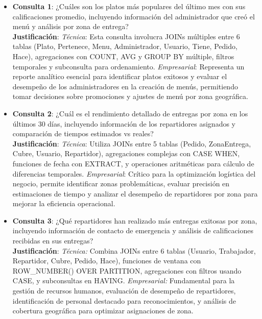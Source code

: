 \documentclass[12pt,a4paper]{article}
\begin{document}
\begin{itemize}
    \item \textbf{Consulta 1}: ¿Cuáles son los platos más populares del último mes con sus calificaciones promedio, incluyendo información del administrador que creó el menú y análisis por zona de entrega?\\
    \textbf{Justificación}: \textit{Técnica}: Esta consulta involucra JOINs múltiples entre 6 tablas (Plato, Pertenece, Menu, Administrador, Usuario, Tiene, Pedido, Hace), agregaciones con COUNT, AVG y GROUP BY múltiple, filtros temporales y subconsulta para ordenamiento. \textit{Empresarial}: Representa un reporte analítico esencial para identificar platos exitosos y evaluar el desempeño de los administradores en la creación de menús, permitiendo tomar decisiones sobre promociones y ajustes de menú por zona geográfica.

    \item \textbf{Consulta 2}: ¿Cuál es el rendimiento detallado de entregas por zona en los últimos 30 días, incluyendo información de los repartidores asignados y comparación de tiempos estimados vs reales?\\
    \textbf{Justificación}: \textit{Técnica}: Utiliza JOINs entre 5 tablas (Pedido, ZonaEntrega, Cubre, Usuario, Repartidor), agregaciones complejas con CASE WHEN, funciones de fecha con EXTRACT, y operaciones aritméticas para cálculo de diferencias temporales. \textit{Empresarial}: Crítico para la optimización logística del negocio, permite identificar zonas problemáticas, evaluar precisión en estimaciones de tiempo y analizar el desempeño de repartidores por zona para mejorar la eficiencia operacional.

    \item \textbf{Consulta 3}: ¿Qué repartidores han realizado más entregas exitosas por zona, incluyendo información de contacto de emergencia y análisis de calificaciones recibidas en sus entregas?\\
    \textbf{Justificación}: \textit{Técnica:} Combina JOINs entre 6 tablas (Usuario, Trabajador, Repartidor, Cubre, Pedido, Hace), funciones de ventana con ROW\_NUMBER() OVER PARTITION, agregaciones con filtros usando CASE, y subconsultas en HAVING. \textit{Empresarial:} Fundamental para la gestión de recursos humanos, evaluación de desempeño de repartidores, identificación de personal destacado para reconocimientos, y análisis de cobertura geográfica para optimizar asignaciones de zona.


\end{itemize}
\end{document}

